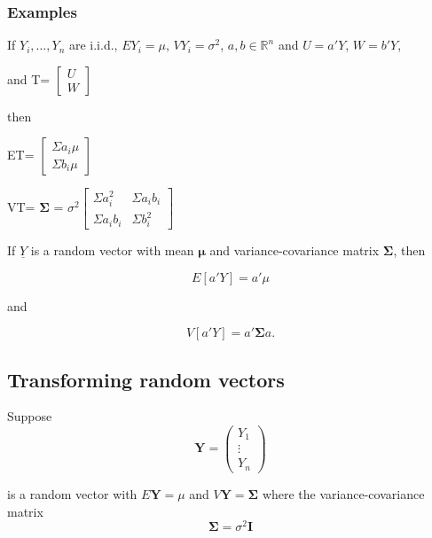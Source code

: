 \documentclass[12pt,a4paper]{article}
\theoremstyle{regla}
\theoremstyle{remark}
\theoremstyle{definition}
\theoremstyle{nonumberbreak}
\begin{document}
\subsubsection{Examples}
\begin{xmpl}
If $Y_i, \ldots , Y_n$ are i.i.d., $EY_i = \mu$, $VY_i = \sigma^2$, $a,b\in\mathbb{R}^n$ and $U=a'Y$, $W=b'Y$,

and T=
$\begin{bmatrix}
U \\
W
\end{bmatrix}$

then

ET=
$\begin{bmatrix}
\Sigma a_i  \mu \\
\Sigma b_i  \mu
\end{bmatrix}$


VT=
$\boldsymbol{\Sigma}$ 
= $\sigma^2
\begin{bmatrix}
\Sigma a_i^2 & \Sigma a_i b_i \\
\Sigma a_ib_i & \Sigma b_i^2
\end{bmatrix}$
\end{xmpl}

\begin{xmpl}

If $\underline{Y}$ is a random vector with mean $\boldsymbol{\mu}$ and variance-covariance matrix 
$\boldsymbol{\Sigma}$, then

$$
E[a'Y] = a'\mu
$$


and 

$$
V[a'Y] = a' \boldsymbol{\Sigma} a.
$$
\end{xmpl}

\subsection{Transforming random vectors}
\begin{fbox}
\begin{minipage}{0.97\textwidth}
Suppose 
\[\mathbf{Y}
=
\left(
\begin{array}{c}
Y_1\\
\vdots \\
Y_n
\end{array} \right)\]

is a random vector with $E \mathbf{Y} = \mu$ and $V \mathbf{Y} = \boldsymbol{\Sigma} $ where the variance-covariance matrix 
$$ \boldsymbol{\Sigma} = \sigma^2 \mathbf{I} $$
\end{minipage}
\end{fbox}
\end{document}
